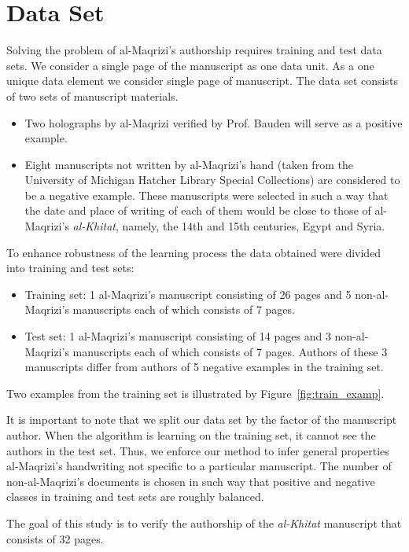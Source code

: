 \documentclass[conference,a4paper]{ieeetran}
\begin{document}
\section{Data Set}
\label{sec:the_data}

Solving the problem of al-Maqrizi's authorship requires training and test data sets. 
We consider a single page of the manuscript as one data unit.
As a one unique data element we consider single page of manuscript. The data set consists of two sets of manuscript materials.
\begin{itemize}
	\item Two holographs by al-Maqrizi verified by Prof. Bauden will serve as a positive example.
	\item Eight manuscripts not written by al-Maqrizi's hand  (taken from the University of Michigan Hatcher Library Special Collections) are considered to be a negative example. These manuscripts were selected in such a way that the date and place of writing of each of them would be close to those of al-Maqrizi's  \textit{al-Khitat}, namely, the 14th and 15th centuries, Egypt and Syria.
\end{itemize}

To enhance robustness of the learning process the data obtained were divided into training and test sets:
\begin{itemize}
	\item Training set: 1 al-Maqrizi's manuscript consisting of 26 pages and 5 non-al-Maqrizi's manuscripts each of which consists of 7 pages.
	\item Test set: 1 al-Maqrizi's manuscript consisting of 14 pages and 3 non-al-Maqrizi's manuscripts each of which consists of 7 pages. Authors of these 3 manuscripts differ from authors of 5 negative examples in the training set.   
\end{itemize}

Two examples from the training set is illustrated by Figure~\ref{fig:train_examp}. 

It is important to note that we split our data set by the factor of the manuscript author. When the algorithm is learning on the training set, it cannot see the authors in the test set. Thus, we enforce our method to infer general properties al-Maqrizi's handwriting not specific to a particular manuscript. The number of non-al-Maqrizi's documents is chosen in such way that positive and negative classes in training and test sets are roughly balanced.

The goal of this study is to verify the authorship of the \textit{al-Khitat} manuscript that consists of 32 pages.
\end{document}
